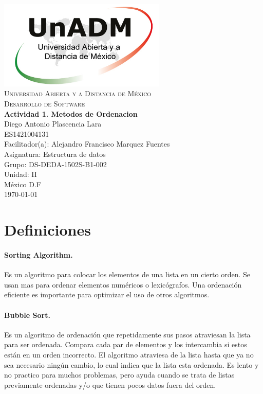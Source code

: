 \documentclass[spanish,12pt,letterpapper]{article}
\begin{document}
	\begin{titlepage}
		\begin{center}
			\includegraphics[width=0.6\textwidth]{./logoUnADM}~\\[1cm] 
			\textsc{Universidad Abierta y a Distancia de M\'exico}\\[0.8cm]
			\textsc{Desarrollo de Software}\\[1.8cm]
			
			\textbf{ \Large Actividad 1. Metodos de Ordenacion }\\[3cm]
			
			Diego Antonio Plascencia Lara\\ ES1421004131 \\[0.4cm]
			Facilitador(a): Alejandro Francisco Marquez Fuentes\\
			Asignatura: Estructura de datos\\
			Grupo: DS-DEDA-1502S-B1-002 \\
			Unidad: II \\
			
			\vfill M\'exico D.F\\{\today}
			
		\end{center}
	\end{titlepage}
	
	\section{Definiciones \\[1cm]}
	
	\paragraph{Sorting Algorithm.}
	Es un algoritmo para colocar los elementos de una lista en un cierto orden. Se usan mas para ordenar elementos numéricos o lexicógrafos. Una ordenación eficiente es importante para optimizar el uso de otros algoritmos.
	
	\paragraph{Bubble Sort.}
	Es un algoritmo de ordenación que repetidamente sus pasos atraviesan la lista para ser ordenada. Compara cada par de elementos y los intercambia si estos están en un orden incorrecto. El algoritmo atraviesa de la lista hasta que ya no sea necesario ningún cambio, lo cual indica que la lista esta ordenada. Es lento y no practico para muchos problemas, pero ayuda cuando se trata de listas previamente ordenadas y/o que tienen pocos datos fuera del orden.
	
\end{document}
